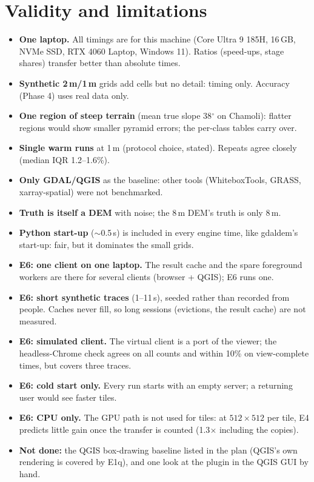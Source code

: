 ﻿\documentclass[11pt,a4paper]{article}
\begin{document}
\section{Validity and limitations}
\begin{itemize}
  \item \textbf{One laptop.} All timings are for this machine (Core Ultra 9 185H, 16\,GB, NVMe SSD, RTX 4060 Laptop,
  Windows 11). Ratios (speed-ups, stage shares) transfer better than absolute times.
  \item \textbf{Synthetic 2\,m/1\,m} grids add cells but no detail: timing only. Accuracy (Phase 4) uses real data only.
  \item \textbf{One region of steep terrain} (mean true slope 38$^\circ$ on Chamoli): flatter regions would show smaller
  pyramid errors; the per-class tables carry over.
  \item \textbf{Single warm runs} at 1\,m (protocol choice, stated). Repeats agree closely (median IQR 1.2--1.6\%).
  \item \textbf{Only GDAL/QGIS} as the baseline: other tools (WhiteboxTools, GRASS, xarray-spatial) were not benchmarked.
  \item \textbf{Truth is itself a DEM} with noise; the 8\,m DEM's truth is only 8\,m.
  \item \textbf{Python start-up} ($\sim$0.5\,s) is included in every engine time, like gdaldem's start-up: fair, but it
  dominates the small grids.
  \item \textbf{E6: one client on one laptop.} The result cache and the spare foreground workers are there for several
  clients (browser + QGIS); E6 runs one.
  \item \textbf{E6: short synthetic traces} (1--11\,s), seeded rather than recorded from people. Caches never fill, so
  long sessions (evictions, the result cache) are not measured.
  \item \textbf{E6: simulated client.} The virtual client is a port of the viewer; the headless-Chrome check agrees on all
  counts and within 10\% on view-complete times, but covers three traces.
  \item \textbf{E6: cold start only.} Every run starts with an empty server; a returning user would see faster tiles.
  \item \textbf{E6: CPU only.} The GPU path is not used for tiles: at $512\times512$ per tile, E4 predicts little gain once the
  transfer is counted (1.3$\times$ including the copies).
  \item \textbf{Not done:} the QGIS box-drawing baseline listed in the plan (QGIS's own rendering is covered by E1q), and
  one look at the plugin in the QGIS GUI by hand.
\end{itemize}
\end{document}

